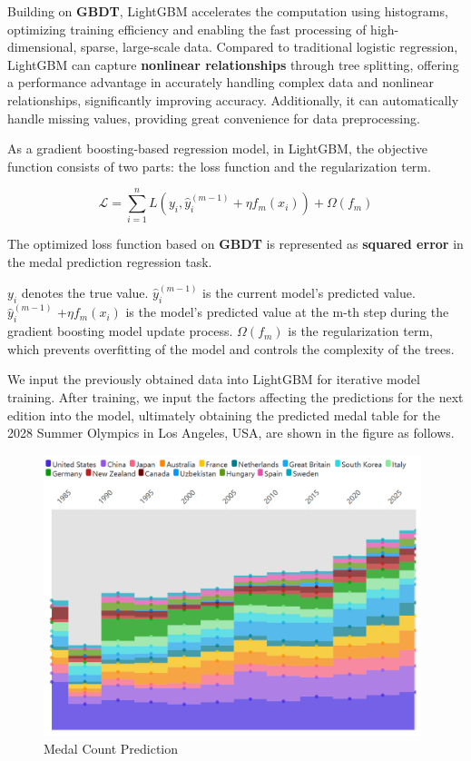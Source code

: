 \documentclass[12pt]{article}  %
\begin{document}
Building on \textbf{GBDT}, LightGBM accelerates the computation using histograms, optimizing training efficiency and enabling the fast processing of high-dimensional, sparse, large-scale data. Compared to traditional logistic regression, LightGBM can capture \textbf{nonlinear relationships} through tree splitting, offering a performance advantage in accurately handling complex data and nonlinear relationships, significantly improving accuracy. Additionally, it can automatically handle missing values, providing great convenience for data preprocessing.

As a gradient boosting-based regression model, in LightGBM, the objective function consists of two parts: the loss function and the regularization term.

\begin{equation}
	\mathcal{L} = \sum_{i=1}^{n} L(y_i, \hat{y}_i^{(m-1)} + \eta f_m(x_i)) + \Omega(f_m)
\end{equation}

The optimized loss function based on \textbf{GBDT}\cite{2} is represented as \textbf{squared error} in the medal prediction regression task.

$y_i$ denotes the true value.
$\hat{y}_i^{(m-1)}$ is the current model's predicted value.
$\hat{y}_i^{(m-1)}$ +$\eta f_m(x_i)$ is the model's predicted value at the m-th step during the gradient boosting model update process.
$\Omega(f_m)$ is the regularization term, which prevents overfitting of the model and controls the complexity of the trees.

We input the previously obtained data into LightGBM for iterative model training. After training, we input the factors affecting the predictions for the next edition into the model, ultimately obtaining the predicted medal table for the 2028 Summer Olympics in Los Angeles, USA, are shown in the figure as follows.
\begin{figure}[H]
	\centering
	\includegraphics[width=11cm]{img/Predict.png}
	\caption{Medal Count Prediction}
	\label{fig:aa}
\end{figure}
\end{document}
